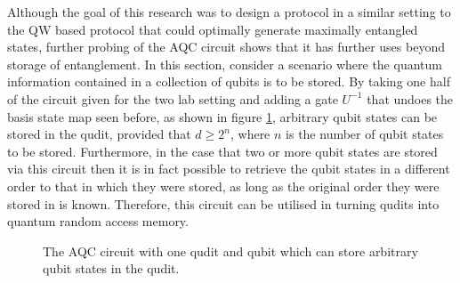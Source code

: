 Although the goal of this research was to design a protocol in a similar setting to the QW based protocol that could optimally generate maximally entangled states, further probing of the AQC circuit shows that it has further uses beyond storage of entanglement.
In this section, consider a scenario where the quantum information contained in a collection of qubits is to be stored.
By taking one half of the circuit given for the two lab setting and adding a gate $U^{-1}$ that undoes the basis state map seen before, as shown in figure \ref{fig:aqc_qbit_store}, arbitrary qubit states can be stored in the qudit, provided that $d \geq 2^n$, where $n$ is the number of qubit states to be stored.
Furthermore, in the case that two or more qubit states are stored via this circuit then it is in fact possible to retrieve the qubit states in a different order to that in which they were stored, as long as the original order they were stored in is known.
Therefore, this circuit can be utilised in turning qudits into quantum random access memory.

\begin{figure}
    \begin{center}
    \caption{The AQC circuit with one qudit and qubit which can store arbitrary qubit states in the qudit.}
    \label{fig:aqc_qbit_store}
    \end{center}
\end{figure}

